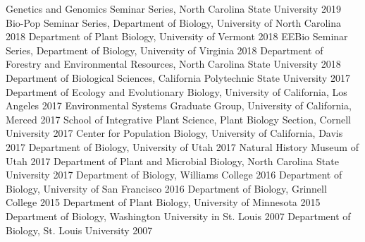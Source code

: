 \documentclass[11pt,english]{article}\usepackage[]{graphicx}\usepackage[]{xcolor}
\begin{document}
Genetics and Genomics Seminar Series, North Carolina State University \hfill {2019} \newline
Bio-Pop Seminar Series, Department of Biology, University of North Carolina \hfill {2018} \newline
Department of Plant Biology, University of Vermont \hfill {2018} \newline
EEBio Seminar Series, Department of Biology, University of Virginia \hfill {2018} \newline
Department of Forestry and Environmental Resources, North Carolina State University \hfill {2018} \newline
Department of Biological Sciences, California Polytechnic State University \hfill {2017} \newline
Department of Ecology and Evolutionary Biology, University of California, Los Angeles \hfill {2017} \newline
Environmental Systems Graduate Group, University of California, Merced \hfill {2017} \newline
School of Integrative Plant Science, Plant Biology Section, Cornell University \hfill {2017} \newline
Center for Population Biology, University of California, Davis \hfill {2017} \newline
Department of Biology, University of Utah \hfill {2017} \newline
Natural History Museum of Utah \hfill {2017} \newline
Department of Plant and Microbial Biology, North Carolina State University \hfill {2017} \newline
Department of Biology, Williams College \hfill {2016} \newline
Department of Biology, University of San Francisco \hfill {2016} \newline
Department of Biology, Grinnell College \hfill {2015} \newline
Department of Plant Biology, University of Minnesota \hfill {2015} \newline
Department of Biology, Washington University in St. Louis \hfill {2007} \newline
Department of Biology, St. Louis University \hfill {2007} \newline
\vspace{-2ex}


\end{document}
